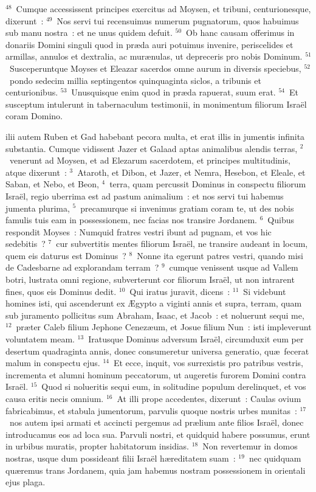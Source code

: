 ${}^{48}$~Cumque accessissent principes exercitus ad Moysen, et tribuni, centurionesque, dixerunt~:
${}^{49}$~Nos servi tui recensuimus numerum pugnatorum, quos habuimus sub manu nostra~: et ne unus quidem defuit.
${}^{50}$~Ob hanc causam offerimus in donariis Domini singuli quod in pr\ae da auri potuimus invenire, periscelides et armillas, annulos et dextralia, ac mur\ae nulas, ut depreceris pro nobis Dominum.
${}^{51}$~Susceperuntque Moyses et Eleazar sacerdos omne aurum in diversis speciebus,
${}^{52}$~pondo sedecim millia septingentos quinquaginta siclos, a tribunis et centurionibus.
${}^{53}$~Unusquisque enim quod in pr\ae da rapuerat, suum erat.
${}^{54}$~Et susceptum intulerunt in tabernaculum testimonii, in monimentum filiorum Isra\"el coram Domino.

\bchapter
{}ilii autem Ruben et Gad habebant pecora multa, et erat illis in jumentis infinita substantia. Cumque vidissent Jazer et Galaad aptas animalibus alendis terras,
${}^{2}$~venerunt ad Moysen, et ad Elezarum sacerdotem, et principes multitudinis, atque dixerunt~:
${}^{3}$~Ataroth, et Dibon, et Jazer, et Nemra, Hesebon, et Eleale, et Saban, et Nebo, et Beon,
${}^{4}$~terra, quam percussit Dominus in conspectu filiorum Isra\"el, regio uberrima est ad pastum animalium~: et nos servi tui habemus jumenta plurima,
${}^{5}$~precamurque si invenimus gratiam coram te, ut des nobis famulis tuis eam in possessionem, nec facias nos transire Jordanem.
${}^{6}$~Quibus respondit Moyses~: Numquid fratres vestri ibunt ad pugnam, et vos hic sedebitis~?
${}^{7}$~cur subvertitis mentes filiorum Isra\"el, ne transire audeant in locum, quem eis daturus est Dominus~?
${}^{8}$~Nonne ita egerunt patres vestri, quando misi de Cadesbarne ad explorandam terram~?
${}^{9}$~cumque venissent usque ad Vallem botri, lustrata omni regione, subverterunt cor filiorum Isra\"el, ut non intrarent fines, quos eis Dominus dedit.
${}^{10}$~Qui iratus juravit, dicens~:
${}^{11}$~Si videbunt homines isti, qui ascenderunt ex \AE gypto a viginti annis et supra, terram, quam sub juramento pollicitus sum Abraham, Isaac, et Jacob~: et noluerunt sequi me,
${}^{12}$~pr\ae ter Caleb filium Jephone Cenez\ae um, et Josue filium Nun~: isti impleverunt voluntatem meam.
${}^{13}$~Iratusque Dominus adversum Isra\"el, circumduxit eum per desertum quadraginta annis, donec consumeretur universa generatio, qu\ae\ fecerat malum in conspectu ejus.
${}^{14}$~Et ecce, inquit, vos surrexistis pro patribus vestris, incrementa et alumni hominum peccatorum, ut augeretis furorem Domini contra Isra\"el.
${}^{15}$~Quod si nolueritis sequi eum, in solitudine populum derelinquet, et vos causa eritis necis omnium.
${}^{16}$~At illi prope accedentes, dixerunt~: Caulas ovium fabricabimus, et stabula jumentorum, parvulis quoque nostris urbes munitas~:
${}^{17}$~nos autem ipsi armati et accincti pergemus ad pr\ae lium ante filios Isra\"el, donec introducamus eos ad loca sua. Parvuli nostri, et quidquid habere possumus, erunt in urbibus muratis, propter habitatorum insidias.
${}^{18}$~Non revertemur in domos nostras, usque dum possideant filii Isra\"el h\ae reditatem suam~:
${}^{19}$~nec quidquam qu\ae remus trans Jordanem, quia jam habemus nostram possessionem in orientali ejus plaga.


